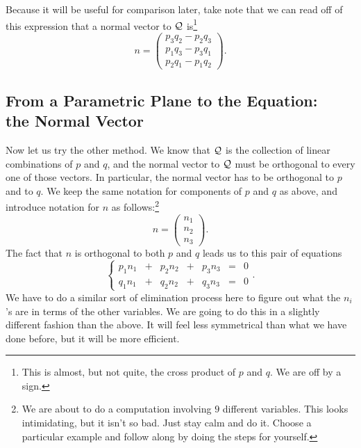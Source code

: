 \documentclass[00-livre-main.tex]{subfiles}
\begin{document}
Because it will be useful for comparison later, take note that 
we can read off of this expression that a normal vector to $\mathcal{Q}$ is\footnote{This is almost, but not quite, the cross product of $p$ and $q$. We are off by a sign.} 
\[
n = \begin{pmatrix} p_3 q_2 - p_2 q_3 \\
p_1 q_3 - p_3 q_1 \\ p_2 q_1 - p_1 q_2 \end{pmatrix}.
\]



\subsection*{From a Parametric Plane to the Equation:\\ the Normal Vector}


Now let us try the other method. We know that $\mathcal{Q}$ is the collection of linear combinations of $p$ and $q$, and the normal vector to $\mathcal{Q}$ must be orthogonal to every one of those vectors. In particular, the normal vector has to be orthogonal to $p$ and to $q$. We keep the same notation for components of $p$ and $q$ as above, and introduce notation for $n$ as follows:\footnote{We are about to do a computation involving $9$ different variables. This looks intimidating, but it isn't so bad. Just stay calm and do it. Choose a particular example and follow along by doing the steps for yourself.}
\[
n = \begin{pmatrix} n_1 \\ n_2 \\ n_3 \end{pmatrix} .
\]
The fact that $n$ is orthogonal to both $p$ and $q$ leads us to this pair of equations
\[
\left\{ \begin{array}{rrrrrrr}
p_1 n_1 & + & p_2 n_2 & + & p_3 n_3 & = & 0 \\
q_1 n_1 & + & q_2 n_2 & + & q_3 n_3 & = & 0 
\end{array}\right. .
\]
We have to do a similar sort of elimination process here to figure out what the $n_i$'s are in terms of the other variables. We are going to do this in a slightly different fashion than the above. It will feel less symmetrical than what we have done before, but it will be more efficient.
\end{document}

